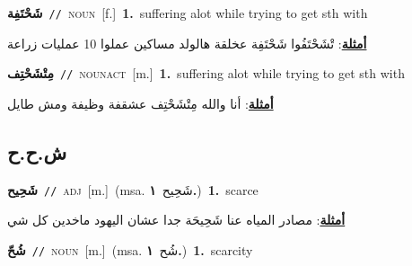 \documentclass[10pt,a4paper,twoside]{article} %
\begin{document}
\begin{multicols}{2}
{\setlength\topsep{0pt}\textbf{\foreignlanguage{arabic}{شَحْتَفِة}}\ {\color{gray}\texttt{//}\color{black}}\ \textsc{noun}\ [f.]\ \textbf{1.}~suffering alot while trying to get sth with\  \begin{flushright}\color{gray}\foreignlanguage{arabic}{\textbf{\underline{\foreignlanguage{arabic}{أمثلة}}}: تْشَحْتَفُوا شَحْتَفِة عخلقة هالولد مساكين عملوا 10 عمليات زراعة}\end{flushright}\color{black}} \vspace{2mm}

{\setlength\topsep{0pt}\textbf{\foreignlanguage{arabic}{مِتْشَحْتِف}}\ {\color{gray}\texttt{//}\color{black}}\ \textsc{noun\textunderscore act}\ [m.]\ \textbf{1.}~suffering alot while trying to get sth with\  \begin{flushright}\color{gray}\foreignlanguage{arabic}{\textbf{\underline{\foreignlanguage{arabic}{أمثلة}}}: أنا والله مِتْشَحْتِف عشقفة وظيفة ومش طايل}\end{flushright}\color{black}} \vspace{2mm}

\vspace{-3mm}
\subsection*{\color{blue}\foreignlanguage{arabic}{ش.ح.ح}\color{blue}{}} 

{\setlength\topsep{0pt}\textbf{\foreignlanguage{arabic}{شَحِيح}}\ {\color{gray}\texttt{//}\color{black}}\ \textsc{adj}\ [m.]\ \color{gray}(msa. \foreignlanguage{arabic}{شَحِيح}~\foreignlanguage{arabic}{\textbf{١.}})\color{black}\ \textbf{1.}~scarce\  \begin{flushright}\color{gray}\foreignlanguage{arabic}{\textbf{\underline{\foreignlanguage{arabic}{أمثلة}}}: مصادر المياه عنا شَحِيحَة جدا عشان اليهود ماخدين كل شي}\end{flushright}\color{black}} \vspace{2mm}

{\setlength\topsep{0pt}\textbf{\foreignlanguage{arabic}{شُحّ}}\ {\color{gray}\texttt{//}\color{black}}\ \textsc{noun}\ [m.]\ \color{gray}(msa. \foreignlanguage{arabic}{شُح}~\foreignlanguage{arabic}{\textbf{١.}})\color{black}\ \textbf{1.}~scarcity\ } \vspace{2mm}


\end{multicols}
\end{document}
